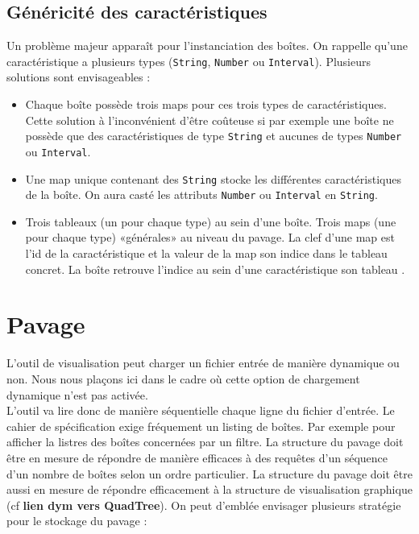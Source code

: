 \subsection{Généricité des caractéristiques}
Un problème majeur apparaît pour l'instanciation des boîtes. On rappelle qu'une caractéristique a plusieurs types (\verb+String+, \verb+Number+ ou \verb+Interval+). Plusieurs solutions sont envisageables : 
\begin{itemize}
\item 
  Chaque boîte possède trois maps pour ces trois types de caractéristiques. Cette solution à l'inconvénient d'être coûteuse si par exemple une boîte ne possède que des caractéristiques de type \verb+String+ et aucunes de types \verb+Number+ ou \verb+Interval+. 
\item
  Une map unique contenant des \verb+String+ stocke les différentes caractéristiques de la boîte. On aura casté les attributs \verb+Number+ ou \verb+Interval+ en \verb+String+.
\item 
Trois tableaux (un pour chaque type) au sein d'une boîte. Trois maps (une pour chaque type) «générales» au niveau du pavage. La clef d'une map est l'id de la caractéristique et la valeur de la map son indice dans le tableau concret. La boîte retrouve l'indice au sein d'une caractéristique son tableau .

\end{itemize}


\section{Pavage}
L'outil de visualisation peut charger un fichier entrée de manière dynamique ou non. Nous nous plaçons ici dans le cadre où cette option de chargement dynamique n'est pas activée. \\ L'outil va lire donc de manière  séquentielle chaque ligne du fichier d'entrée. Le cahier de spécification exige fréquement un listing de boîtes. Par exemple pour afficher la listres des boîtes concernées par un filtre. La structure du pavage doit être en mesure de répondre de manière efficaces à des requêtes d'un séquence d'un nombre de  boîtes selon un ordre particulier. La structure du pavage doit être aussi en mesure de répondre efficacement à la structure  de visualisation graphique (cf \textbf{lien dym vers QuadTree}). On peut d'emblée envisager plusieurs stratégie pour le stockage du pavage :

